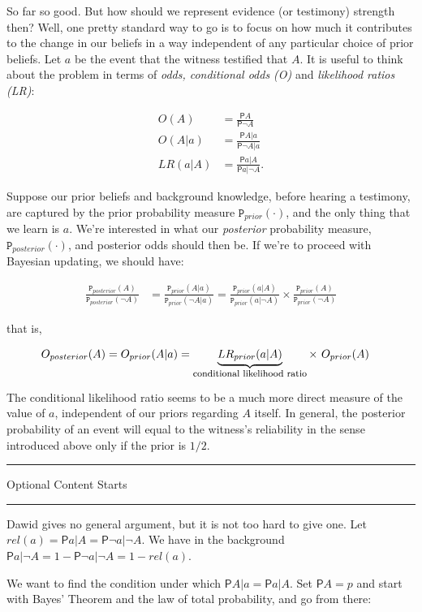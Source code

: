 \documentclass[10pt,dvipsnames,enabledeprecatedfontcommands]{scrartcl}
\newcommand{\n}{\neg}
\newcommand{\pr}{\mathsf{P}}
\newcommand{\prr}[1]{\mbox{$\mathtt{P}_{prior}(#1)$}}
\newcommand{\prp}[1]{\mbox{$\mathtt{P}_{posterior}(#1)$}}
\newcommand{\intermezzoa}{
	\begin{minipage}[c]{13cm}
	\begin{center}\rule{10cm}{0.4pt}



	\tiny{\sc Optional Content Starts}
	
	\vspace{-1mm}
	
	\rule{10cm}{0.4pt}\end{center}
	\end{minipage}\nopagebreak 
	}
\begin{document}
So far so good. But how should we represent evidence (or testimony)
strength then? Well, one pretty standard way to go is to focus on how
much it contributes to the change in our beliefs in a way independent of
any particular choice of prior beliefs. Let \(a\) be the event that the
witness testified that \(A\). It is useful to think about the problem in
terms of \emph{odds, conditional odds (O)} and
\emph{likelihood ratios (LR)}:

\begin{align*} O(A)  & = \frac{\pr{A}}{\pr{\n A}}\\
 O(A\vert a) &= \frac{\pr{A\vert a}}{\pr{\n A \vert a}}  \\
 LR(a\vert A) &= \frac{\pr{a\vert A}}{\pr{a\vert \n A}}. 
\end{align*}

Suppose our prior beliefs and background knowledge, before hearing a
testimony, are captured by the prior probability measure
\(\prr{\cdot}\), and the only thing that we learn is \(a\). We're
interested in what our \emph{posterior} probability measure,
\(\prp{\cdot}\), and posterior odds should then be. If we're to proceed
with Bayesian updating, we should have:

\begin{align*}
 \frac{\prp{A}}{\prp{\n A}} & = \frac{\prr{A\vert a}}{\prr{\n A\vert a}}
 =
 \frac{\prr{a\vert A}}{\prr{a\vert \n A}}
 \times
 \frac{\prr{A}}{\prr{\n A}}
  \end{align*}

that is,

\begin{align}
 \label{bayesodss2}
 O_{posterior}(A)& = O_{prior}(A\vert a) = \underbrace{LR_{prior}(a\vert A)}_{\mbox{\footnotesize conditional likelihood ratio}}\times \,\, O_{prior}(A)
 \end{align}

The conditional likelihood ratio seems to be a much more direct measure
of the value of \(a\), independent of our priors regarding \(A\) itself.
In general, the posterior probability of an event will equal to the
witness's reliability in the sense introduced above only if the prior is
\(1/2\).

\intermezzoa

Dawid gives no general argument, but it is not too hard to give one. Let
\(rel(a)=\pr{a\vert A}=\pr{\n a\vert \n A}\). We have in the background
\(\pr{a\vert \n A}=1-\pr{\n a\vert \n A}=1-rel(a)\).

We want to find the condition under which
\(\pr{A\vert a} = \pr{a\vert A}\). Set \(\pr{A}=p\) and start with
Bayes' Theorem and the law of total probability, and go from there:
\end{document}
